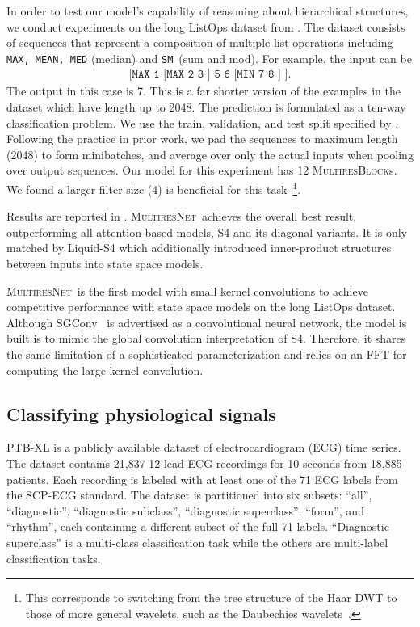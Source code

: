 \documentclass{article}
\theoremstyle{plain}
\theoremstyle{definition}
\theoremstyle{remark}
\newcommand{\ourmodel}{\textsc{MultiresNet}}
\begin{document}
In order to test our model's capability of reasoning about hierarchical structures, we conduct experiments on the long ListOps dataset from \citet{tay2021long}. 
The dataset consists of sequences that represent a composition of multiple list operations including \texttt{MAX, MEAN, MED} (median) and \texttt{SM}~(sum and mod). 
For example, the input can be
\begin{align*}
\texttt{[MAX 1 [MAX 2 3 ] 5 6 [MIN 7 8 ] ]}.  
\end{align*}
The output in this case is 7. 
This is a far shorter version of the examples in the dataset which have length up to 2048. 
The prediction is formulated as a ten-way classification problem. 
We use the train, validation, and test split specified by \citet{tay2021long}. 
Following the practice in prior work, we pad the sequences to maximum length (2048) to form minibatches, and average over only the actual inputs when pooling over output sequences. Our model for this experiment has 12 \textsc{MultiresBlock}s. 
We found a larger filter size (4) is beneficial for this task~\footnote{This corresponds to switching from the tree structure of the Haar DWT to those of more general wavelets, such as the Daubechies wavelets~\citep{akansu2001multiresolution}.}. 

Results are reported in . 
\ourmodel\ achieves the overall best result, outperforming all attention-based models, S4 and its diagonal variants. 
It is only matched by Liquid-S4 which additionally introduced inner-product structures between inputs into state space models. 

\ourmodel\ is the first model with small kernel convolutions to achieve competitive performance with state space models on the long ListOps dataset. 
Although SGConv~\citep{li2022makes} is advertised as a convolutional neural network, the model is built is to mimic the global convolution interpretation of S4. 
Therefore, it shares the same limitation of a sophisticated parameterization and relies on an FFT for computing the large kernel convolution. 




\subsection{Classifying physiological signals}
PTB-XL \citep{Wagner2020PTBXLLargePublicly} is a publicly available dataset of electrocardiogram (ECG) time series. The dataset contains 21,837 12-lead ECG recordings for 10 seconds from 18,885 patients.
Each recording is labeled with at least one of the 71 ECG labels from the SCP-ECG standard.
The dataset is partitioned into six subsets: ``all'', ``diagnostic'', ``diagnostic subclass'', ``diagnostic superclass'', ``form'', and ``rhythm'', each containing a different subset of the full 71 labels.
``Diagnostic superclass'' is a multi-class classification task while the others are multi-label classification tasks.
\end{document}
